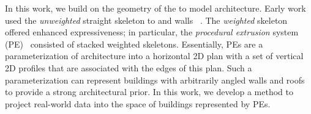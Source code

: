 In this work, we build on the geometry of the  to model architecture. Early work used the \emph{unweighted} straight skeleton to  and walls ~\cite{fang2013image}. 
The \emph{weighted} skeleton~\cite{eppstein1999raising} offered enhanced expressiveness; in particular, the \emph{procedural extrusion} system (PE)~\cite{kelly2011interactive} consisted of stacked weighted skeletons.  Essentially, PEs are a parameterization of architecture into a horizontal 2D plan with a set of vertical 2D profiles that are associated with the edges of this plan. Such a parameterization can represent buildings with arbitrarily angled walls and roofs to provide a strong architectural prior. In this work, we develop a method to project real-world data into the space of buildings represented by PEs.
